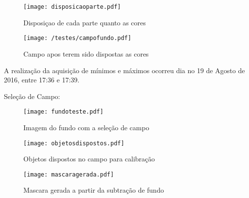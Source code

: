 \begin{figure}[H]
\begin{minipage}[b]{0.45\linewidth}
\centering
\texttt{[image: disposicaoparte.pdf]}
\caption{Disposiçao de cada parte quanto as cores}
\label{fig:figure1}
\end{minipage}
\hspace{0.5cm}
\begin{minipage}[b]{0.45\linewidth}
\centering
\texttt{[image: /testes/campofundo.pdf]}
\caption{Campo apos terem sido dispostas as cores}
\label{fig:figure2}
\end{minipage}
\end{figure}

	
A realização da aquisição de mínimos e máximos ocorreu dia no 19 de Agosto de 2016, entre 17:36 e 17:39.

Seleção de Campo:
\begin{figure}[H]
		\centering
		\texttt{[image: fundoteste.pdf]}
		\caption{Imagem do fundo com a seleção de campo}
		\label{disposicaoparte}
	\end{figure}

	
	\begin{figure}[H]
\begin{minipage}[H]{0.34\linewidth}
\hspace{0.5cm}
\centering
\texttt{[image: objetosdispostos.pdf]}
\caption{Objetos dispostos no campo para calibração}
\label{fig:figure1}
\end{minipage}
\hspace{0.5cm}
\begin{minipage}[H]{0.40\linewidth}
\centering
\texttt{[image: mascaragerada.pdf]}
\caption{Mascara gerada a partir da subtração de fundo}
\label{fig:figure2}
\end{minipage}
\end{figure}	
	
